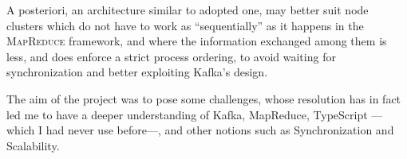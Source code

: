 A posteriori, an architecture similar to adopted one, may better suit node clusters which do not have to work as ``sequentially'' as it happens in the \textsc{MapReduce} framework, and where the information exchanged among them is less, and does enforce a strict process ordering, to avoid waiting for synchronization and better exploiting Kafka's design.

The aim of the project was to pose some challenges, whose resolution has in fact led me to have a deeper understanding of Kafka, MapReduce, TypeScript ---which I had never use before---, and other notions such as Synchronization and Scalability.